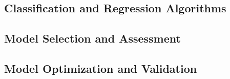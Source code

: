 \subsection{Classification and Regression Algorithms}
\label{sec:algs}


\subsection{Model Selection and Assessment}
\label{sec:selectass}


\subsection{Model Optimization and Validation}
\label{sec:optvalid}

